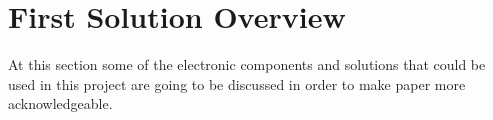 \section{First Solution Overview}\label{sec:electronic-background}
		At this section some of the electronic components and solutions that could be used in this project are going to be discussed in order to make paper more acknowledgeable.
	
	
	
	
	
	
	
	
	